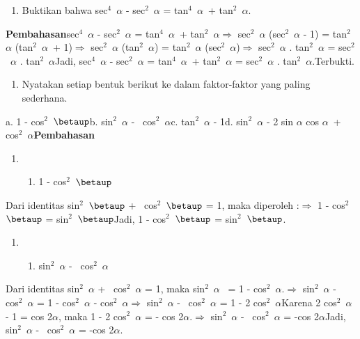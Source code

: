 \documentclass[11pt,fleqn]{book} %
\begin{document}
\begin{myEnumerate}
\begin{itemize}
\begin{enumerate}
\item  Buktikan bahwa sec${}^{4}$~$\alpha$ - sec${}^{2}$~$\alpha$ = tan${}^{4}$~$\alpha$~+ tan${}^{2}$~$\alpha$.
\end{enumerate}

\noindent \textbf{Pembahasan}sec${}^{4}$~$\alpha$ - sec${}^{2}$~$\alpha$ = tan${}^{4}$~$\alpha$~+ tan${}^{2}$~$\alpha$$\mathrm{\Rightarrow }$ sec${}^{2}$~$\alpha$ (sec${}^{2}$~$\alpha$ - 1) = tan${}^{2}$~$\alpha$ (tan${}^{2}$~$\alpha$~+ 1)$\mathrm{\Rightarrow }$ sec${}^{2}$~$\alpha$ (tan${}^{2}$~$\alpha$) = tan${}^{2}$~$\alpha$ (sec${}^{2}$~$\alpha$)$\mathrm{\Rightarrow }$ sec${}^{2}$~$\alpha$ . tan${}^{2}$~$\alpha$ = sec${}^{2}$~$\alpha$ . tan${}^{2}$~$\alpha$Jadi, sec${}^{4}$~$\alpha$ - sec${}^{2}$~$\alpha$ = tan${}^{4}$~$\alpha$~+ tan${}^{2}$~$\alpha$ = sec${}^{2}$~$\alpha$ . tan${}^{2}$~$\alpha$.Terbukti.

\begin{enumerate}
\item  Nyatakan setiap bentuk berikut ke dalam faktor-faktor yang paling sederhana.
\end{enumerate}

\noindent a. 1 - cos${}^{2}$~$\betaup$b. sin${}^{2}$~$\alpha$ -~ cos${}^{2}$~$\alpha$c. tan${}^{2}$~$\alpha$ - 1d. sin${}^{2}$~$\alpha$ - 2 sin $\alpha$ cos $\alpha$~+ cos${}^{2}$~$\alpha$\textbf{Pembahasan}

\begin{enumerate}
\item \begin{enumerate}
\item  1 - cos${}^{2}$~$\betaup$
\end{enumerate}
\end{enumerate}

\noindent Dari identitas sin${}^{2}$~$\betaup$ +~ cos${}^{2}$~$\betaup$ = 1, maka diperoleh :$\mathrm{\Rightarrow }$ 1 - cos${}^{2}$~$\betaup$ = sin${}^{2}$~$\betaup$Jadi, 1 - cos${}^{2}$~$\betaup$ = sin${}^{2}$~$\betaup$.

\begin{enumerate}
\item \begin{enumerate}
\item  sin${}^{2}$~$\alpha$ -~ cos${}^{2}$~$\alpha$
\end{enumerate}
\end{enumerate}

\noindent Dari identitas sin${}^{2}$~$\alpha$ +~ cos${}^{2}$~$\alpha$ = 1, maka sin${}^{2}$~$\alpha$~ = 1 - cos${}^{2}$~$\alpha$.$\mathrm{\Rightarrow }$ sin${}^{2}$~$\alpha$ -~ cos${}^{2}$~$\alpha$ = 1 - cos${}^{2}$~$\alpha$ - cos${}^{2}$~$\alpha$$\mathrm{\Rightarrow }$ sin${}^{2}$~$\alpha$ -~ cos${}^{2}$~$\alpha$ = 1 - 2 cos${}^{2}$~$\alpha$Karena 2 cos${}^{2}$~$\alpha$ - 1 = cos 2$\alpha$, maka 1 - 2 cos${}^{2}$~$\alpha$ = - cos 2$\alpha$.$\mathrm{\Rightarrow }$ sin${}^{2}$~$\alpha$ -~ cos${}^{2}$~$\alpha$ = -cos 2$\alpha$Jadi, sin${}^{2}$~$\alpha$ -~ cos${}^{2}$~$\alpha$ = -cos 2$\alpha$.


\end{itemize}
\end{myEnumerate}
\end{document}
